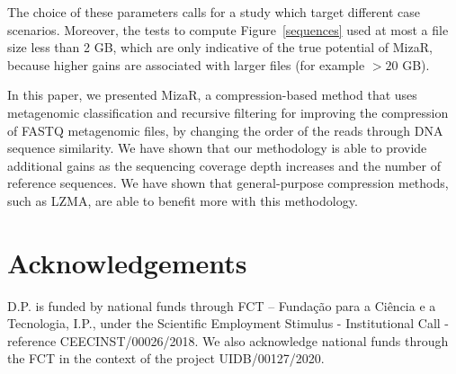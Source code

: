 \documentclass[smallabstract,smallcaptions]{dccpaper}
\begin{document}
The choice of these parameters calls for a study which target different case scenarios. Moreover, the tests to compute Figure~\ref{sequences} used at most a file size less than 2 GB, which are only indicative of the true potential of MizaR, because higher gains are associated with larger files (for example $>20$ GB).


In this paper, we presented MizaR, a compression-based method that uses metagenomic classification and recursive filtering for improving the compression of FASTQ metagenomic files, by changing the order of the reads through DNA sequence similarity. We have shown that our methodology is able to provide additional gains as the sequencing coverage depth increases and the number of reference sequences. We have shown that general-purpose compression methods, such as LZMA, are able to benefit more with this methodology.


\section*{Acknowledgements}

D.P. is funded by national funds through FCT – Fundação para a Ciência e a Tecnologia, I.P., under the Scientific Employment Stimulus - Institutional Call - reference CEECINST/00026/2018. We also acknowledge national funds through the FCT in the context of the project UIDB/00127/2020.


\end{document}
